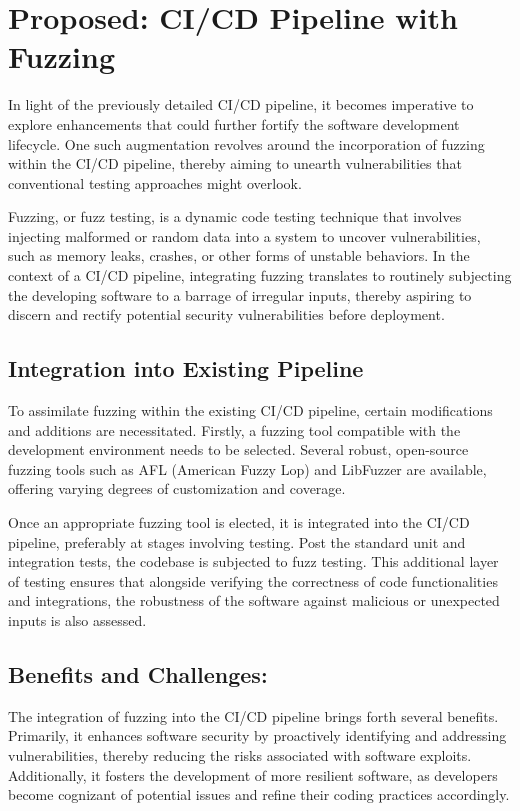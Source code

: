 \section{Proposed: CI/CD Pipeline with Fuzzing}
In light of the previously detailed CI/CD pipeline, it becomes imperative to
explore enhancements that could further fortify the software development
lifecycle. One such augmentation revolves around the incorporation of
fuzzing within the CI/CD pipeline, thereby aiming to unearth vulnerabilities
that conventional testing approaches might overlook.

Fuzzing, or fuzz testing, is a dynamic code testing technique that involves
injecting malformed or random data into a system to uncover vulnerabilities,
such as memory leaks, crashes, or other forms of unstable behaviors.
In the context of a CI/CD pipeline, integrating fuzzing translates to
routinely subjecting the developing software to a barrage of irregular inputs,
thereby aspiring to discern and rectify potential security vulnerabilities
before deployment.

\subsection{Integration into Existing Pipeline}
To assimilate fuzzing within the existing CI/CD pipeline, certain modifications
and additions are necessitated. Firstly, a fuzzing tool
compatible with the development environment needs to be selected.
Several robust, open-source fuzzing tools such as
AFL (American Fuzzy Lop) and LibFuzzer are available,
offering varying degrees of customization and coverage.

Once an appropriate fuzzing tool is elected, it is integrated into the CI/CD
pipeline, preferably at stages involving testing. Post the standard unit and
integration tests, the codebase is subjected to fuzz testing. This additional
layer of testing ensures that alongside verifying the correctness of code
functionalities and integrations, the robustness of the software against
malicious or unexpected inputs is also assessed.

\subsection*{Benefits and Challenges:}
The integration of fuzzing into the CI/CD pipeline brings forth several benefits.
Primarily, it enhances software security by proactively identifying and
addressing vulnerabilities, thereby reducing the risks associated with software
exploits. Additionally, it fosters the development of more resilient software,
as developers become cognizant of potential issues and refine their coding
practices accordingly\cite{HowCICDI34:online}.

